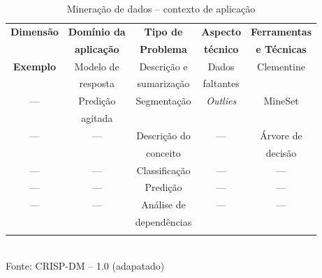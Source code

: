 \begin{table}[!ht]

\caption{Mineração de dados -- contexto de aplicação \cite{Crisp2000}}
\vspace{1mm}
\centering
\begin{tabular}{c|c|c|c|c}
\textbf{Dimensão} & \textbf{Domínio da} & \textbf{Tipo de } & \textbf{Aspecto } & \textbf{Ferramentas } \\
		  & \textbf{aplicação}  & \textbf{Problema} & \textbf{técnico}  & \textbf{e Técnicas}   \\ \hline
\textbf{Exemplo}  & Modelo de           & Descrição e       & Dados             & Clementine  \\
                  & resposta            & sumarização       & faltantes         &             \\ \hline
      --- 	      & Predição            & Segmentação       & \textit{Outlies}  & MineSet     \\
         	      & agitada             &                   &                   &             \\ \hline
      ---         & ---                 & Descrição do      & ---               & Árvore de   \\
                  &                     & conceito          &                   & decisão     \\ \hline
      ---         & ---                 & Classificação     & ---               & ---         \\ \hline
      ---         & ---                 & Predição          & ---               & ---         \\ \hline
      ---         & ---                 & Análise de        & ---               & ---         \\
                  &                     & dependências      &                   & \\            
\\
\end{tabular}
\\
\tiny Fonte: CRISP-DM -- 1.0 (adapatado)
\end{table}

